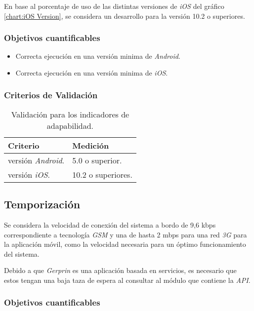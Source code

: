 En base al porcentaje de uso de las distintas versiones de \emph{iOS} del gráfico \ref{chart:iOS Version}, se considera un desarrollo para la versión 10.2 o superiores.

\subsubsection{Objetivos cuantificables}

\begin{itemize}
	\item
	Correcta ejecución en una versión minima de \emph{Android}.
	\item
	Correcta ejecución en una versión minima de \emph{iOS}.
\end{itemize}

\subsubsection{Criterios de Validación}

\begin{table}[H]
    \caption[Validación para los indicadores de adapabilidad.] {Validación para los indicadores de adapabilidad.}
    \label{tbl:Criterios de Validación Adapabilidad}
    \begin{tabular}{|p{}|p{}|}
        \hline
        \textbf{Criterio} &  \textbf{Medición}\\
    	\hline
    	\hline
    	versión \emph{Android}. & 5.0 o superior. \\ \hline
		versión \emph{iOS}.  & 10.2 o superiores. \\ 
        \hline
    \end{tabular}
\end{table}

\subsection{Temporización}

Se considera la velocidad de conexión del sistema a bordo de 9,6 kbps correspondiente a tecnología \emph{GSM} y una de hasta 2 mbps para una red \emph{3G} para la aplicación móvil, como la velocidad necesaria para un óptimo funcionamiento del sistema.

Debido a que \emph{Gerprin} es una aplicación basada en servicios, es necesario que estos tengan una baja taza de espera al consultar al módulo que contiene la \emph{API}.

\subsubsection{Objetivos cuantificables}

